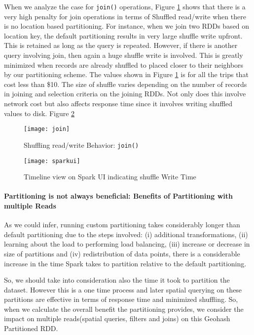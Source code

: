 \documentclass[article,type=msc,colorback,12pt,accentcolor=tud1d]{tudthesis}
\begin{document}
			When we analyze the case for \texttt{join()} operations, Figure \ref{fig:join} shows that there is a very high penalty for join operations in terms of Shuffled read/write when there is no location based partitioning. For instance, when we join two RDDs based on location key, the default partitioning results in very large shuffle write upfront. This is retained as long as the query is repeated. However, if there is another query involving join, then again a huge shuffle write is involved. This is greatly minimized when records are already shuffled to placed closer to their neighbors by our partitioning scheme. The values shown in Figure \ref{fig:join} is for all the trips that cost less than \$10. The size of shuffle varies depending on the number of records in joining and selection criteria on the joining RDDs. Not only does this involve network cost but also affects response time since it involves writing shuffled values to disk. Figure \ref{fig:sparkui}			
				
				\begin{figure}[h]
					\centering
					\texttt{[image: join]}
					\caption{Shuffling read/write Behavior: \texttt{join()}} 
				\label{fig:join}
			\end{figure}
			
				\begin{figure}[h]
					\centering
					\texttt{[image: sparkui]}
					\caption{Timeline view on Spark UI indicating shuffle Write Time} 
					\label{fig:sparkui}
				\end{figure}
			\clearpage
			\paragraph{Partitioning is not always beneficial: Benefits of Partitioning with multiple Reads}
			
			As we could infer, running custom partitioning takes considerably longer than default partitioning due to the steps involved:  (i) additional transformations, (ii) learning about the load to performing load balancing, (iii) increase or decrease in size of partitions and  (iv) redistribution of data points, there is a considerable increase in the time Spark takes to partition relative to the default partitioning. 
			
			So, we should take into consideration also the time it took to partition the dataset. However this is a one time process and later spatial querying on these partitions are effective in terms of response time and minimized shuffling. So, when we calculate the overall benefit the partitioning provides, we consider the impact on multiple reads(spatial queries, filters and joins) on this Geohash Partitioned RDD. 
							 
\end{document}

